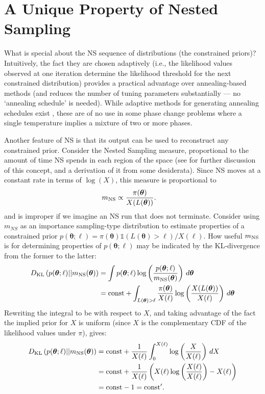 \documentclass[entropy,article,submit,moreauthors,pdftex,10pt,a4paper]{Definitions/mdpi}
\newcommand{\xx}{\boldsymbol{\theta}}
\begin{document}
\section{A Unique Property of Nested Sampling}\label{sec:property}
What is special about the NS sequence of distributions (the constrained priors)?
Intuitively, the fact they are chosen adaptively (i.e., the likelihood values
observed
at one iteration determine the likelihood threshold for the next constrained
distribution)
provides a practical advantage
over annealing-based methods (and reduces the number of tuning parameters
substantially --- no `annealing schedule' is needed). While adaptive methods
for generating annealing schedules exist \citep{salomone2018unbiased}, these
are of no use in some phase change problems where a single temperature implies
a mixture of two or more phases.

Another feature of NS is that its output can be used to reconstruct
any constrained prior. Consider the Nested Sampling measure, proportional
to the amount of time
NS spends in each region of the space (see \citet{polson2014vertical}
for further discussion of this concept, and a derivation of it from some
desiderata).
Since NS moves at a constant rate
in terms of $\log(X)$, this measure is proportional to
\begin{align}
m_{\rm NS} &\propto \frac{\pi(\xx)}{X(L(\xx))}.\label{eqn:measure}
\end{align}
and is improper if we imagine an NS run that does not terminate.
Consider using $m_{NS}$ as an importance sampling-type distribution to
estimate properties of a constrained prior
$p(\xx ; \ell) = \pi(\xx)\mathds{1}(L(\xx) > \ell)/X(\ell)$.
How useful $m_{\rm NS}$ is for determining properties of $p(\xx ; \ell)$
may be indicated by the KL-divergence from the former to the latter:
\begin{align}
D_{\rm KL}\left(p(\xx ; \ell) || m_{\rm NS}(\xx)\right)
    &= \int p(\xx ; \ell)
                \log \left(\frac{p(\xx ; \ell)}{m_{\rm NS}(\xx)}\right)
                \, d\xx \\
    &= \textnormal{const} + \int_{L(\xx) > \ell} \frac{\pi(\xx)}{X(\ell)}
                \log \left(\frac{X(L(\xx))}{X(\ell)}\right) \, d\xx
\end{align}
Rewriting the integral to be with respect to $X$,
and taking advantage of the
fact the implied prior for $X$ is uniform (since $X$ is the complementary
CDF of the likelihood values under $\pi$), gives:
\begin{align}
D_{\rm KL}\left(p(\xx ; \ell) || m_{\rm NS}(\xx)\right)
    &= \textnormal{const} + \frac{1}{X(\ell)}\int_0^{X(\ell)} 
                \log \left(\frac{X}{X(\ell)}\right) \, dX\\
    &= \textnormal{const} + \frac{1}{X(\ell)}\left(
                    X(\ell)\log \left(\frac{X(\ell)}{X(\ell)}\right) - X(\ell)\right)\\
    &= \textnormal{const} -1 = \textnormal{const}'.
\end{align}
\end{document}
